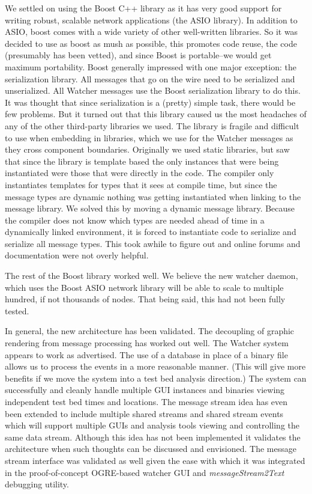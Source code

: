 \documentclass{report}
\begin{document}
We settled on using the Boost C++ library as it has very good support for writing robust, scalable network applications (the ASIO library). In addition
to ASIO, boost comes with a wide variety of other well-written libraries. So it was decided to use as boost as mush as possible, this promotes code reuse, 
the code (presumably has been vetted), and since Boost is portable--we would get maximum portability. Boost generally impressed with one major exception: the 
serialization library. All messages that go on the wire need to be serialized and unserialized. All Watcher messages use the Boost serialization library to do
this. It was thought that since serialization is a (pretty) simple task, there would be few problems. But it turned out that this library caused us the most headaches 
of any of the other third-party libraries we used. The library is fragile and difficult to use when embedding in libraries, which we use for the Watcher messages as they 
cross component boundaries. Originally we used static libraries, but saw that since the library is template based the only instances that were being instantiated 
were those that were directly in the code. The compiler only instantiates templates for types that it sees at compile time, but since the message types are dynamic
nothing was getting instantiated when linking to the message library. We solved this by moving a dynamic message library. Because the compiler does not know which types
are needed ahead of time in a dynamically linked environment, it is forced to instantiate code to serialize and serialize all message types. This took awhile to 
figure out and online forums and documentation were not overly helpful. 

The rest of the Boost library worked well. We believe the new watcher daemon, which uses the Boost ASIO network library will be able to scale
to multiple hundred, if not thousands of nodes. That being said, this had not been fully tested. 

In general, the new architecture has been validated. The decoupling of graphic rendering from message processing has worked out well. The Watcher system
appears to work as advertised. The use of a database in place of a binary file allows us to process the events in a more reasonable manner. (This will give
more benefits if we move the system into a test bed analysis direction.) The system can successfully and cleanly handle multiple GUI instances and binaries 
viewing independent test bed times and locations. The message stream idea has even been extended to include multiple shared streams and shared stream events
which will support multiple GUIs and analysis tools viewing and controlling the same data stream. Although this idea has not been implemented it validates
the architecture when such thoughts can be discussed and envisioned. The message stream interface was validated as well given the ease with which it 
was integrated in the proof-of-concept OGRE-based watcher GUI and {\it messageStream2Text} debugging utility. 
\end{document}
